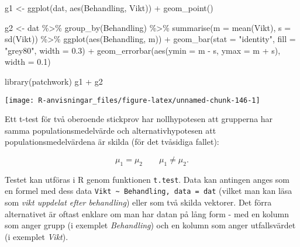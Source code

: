\documentclass[
]{book}
\newenvironment{Shaded}{\begin{snugshade}}{\end{snugshade}}
\newcommand{\AttributeTok}[1]{\textcolor[rgb]{0.77,0.63,0.00}{#1}}
\newcommand{\FloatTok}[1]{\textcolor[rgb]{0.00,0.00,0.81}{#1}}
\newcommand{\FunctionTok}[1]{\textcolor[rgb]{0.00,0.00,0.00}{#1}}
\newcommand{\NormalTok}[1]{#1}
\newcommand{\OtherTok}[1]{\textcolor[rgb]{0.56,0.35,0.01}{#1}}
\newcommand{\SpecialCharTok}[1]{\textcolor[rgb]{0.00,0.00,0.00}{#1}}
\newcommand{\StringTok}[1]{\textcolor[rgb]{0.31,0.60,0.02}{#1}}
\theoremstyle{definition}
\theoremstyle{definition}
\theoremstyle{definition}
\theoremstyle{definition}
\theoremstyle{remark}
\begin{document}
\begin{Shaded}
\begin{Highlighting}[]
\NormalTok{g1 }\OtherTok{\textless{}{-}} \FunctionTok{ggplot}\NormalTok{(dat, }\FunctionTok{aes}\NormalTok{(Behandling, Vikt)) }\SpecialCharTok{+}
  \FunctionTok{geom\_point}\NormalTok{()}

\NormalTok{g2 }\OtherTok{\textless{}{-}}\NormalTok{ dat }\SpecialCharTok{\%\textgreater{}\%} 
  \FunctionTok{group\_by}\NormalTok{(Behandling) }\SpecialCharTok{\%\textgreater{}\%} 
  \FunctionTok{summarise}\NormalTok{(}\AttributeTok{m =} \FunctionTok{mean}\NormalTok{(Vikt), }\AttributeTok{s =} \FunctionTok{sd}\NormalTok{(Vikt)) }\SpecialCharTok{\%\textgreater{}\%} 
  \FunctionTok{ggplot}\NormalTok{(}\FunctionTok{aes}\NormalTok{(Behandling, m)) }\SpecialCharTok{+}
  \FunctionTok{geom\_bar}\NormalTok{(}\AttributeTok{stat =} \StringTok{"identity"}\NormalTok{, }\AttributeTok{fill =} \StringTok{"grey80"}\NormalTok{, }\AttributeTok{width =} \FloatTok{0.3}\NormalTok{) }\SpecialCharTok{+}
  \FunctionTok{geom\_errorbar}\NormalTok{(}\FunctionTok{aes}\NormalTok{(}\AttributeTok{ymin =}\NormalTok{ m }\SpecialCharTok{{-}}\NormalTok{ s, }\AttributeTok{ymax =}\NormalTok{ m }\SpecialCharTok{+}\NormalTok{ s), }\AttributeTok{width =} \FloatTok{0.1}\NormalTok{)}

\FunctionTok{library}\NormalTok{(patchwork)}
\NormalTok{g1 }\SpecialCharTok{+}\NormalTok{ g2}
\end{Highlighting}
\end{Shaded}

\begin{center}\texttt{[image: R-anvisningar\_files/figure-latex/unnamed-chunk-146-1]} \end{center}

Ett t-test för två oberoende stickprov har nollhypotesen att grupperna har samma populationsmedelvärde och alternativhypotesen att populationsmedelvärdena är skilda (för det tvåsidiga fallet):

\[\mu_1 = \mu_2 \qquad \mu_1 \neq \mu_2.\]

Testet kan utföras i R genom funktionen \texttt{t.test}. Data kan antingen anges som en formel med dess data \texttt{Vikt\ \textasciitilde{}\ Behandling,\ data\ =\ dat} (vilket man kan läsa som \emph{vikt uppdelat efter behandling}) eller som två skilda vektorer. Det förra alternativet är oftast enklare om man har datan på lång form - med en kolumn som anger grupp (i exemplet \emph{Behandling}) och en kolumn som anger utfallsvärdet (i exemplet \emph{Vikt}).
\end{document}

